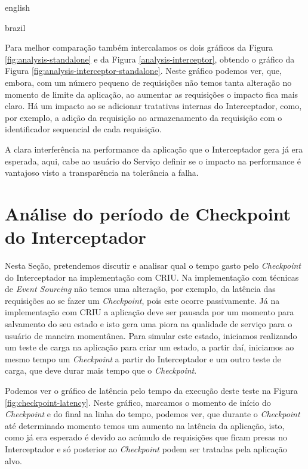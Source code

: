 \begin{otherlanguage*}{english}
\begin{otherlanguage*}{brazil}

Para melhor comparação também intercalamos os dois gráficos da Figura
\ref{fig:analysis-standalone} e da Figura \ref{analysis-interceptor}, obtendo o gráfico
da Figura \ref{fig:analysis-interceptor-standalone}. Neste gráfico podemos ver, que,
embora, com um número pequeno de requisições não temos tanta alteração no momento de
limite da aplicação, ao aumentar as requisições o impacto fica mais claro. Há um impacto
ao se adicionar tratativas internas do Interceptador, como, por exemplo, a adição da
requisição ao armazenamento da requisição com o identificador sequencial de cada requisição.


A clara interferência na performance da aplicação que o Interceptador gera já era esperada,
aqui, cabe ao usuário do Serviço definir se o impacto na performance é vantajoso visto
a transparência na tolerância a falha.

\section{Análise do período de Checkpoint do Interceptador}

Nesta Seção, pretendemos discutir e analisar qual o tempo gasto pelo \textit{Checkpoint} do
Interceptador na implementação com CRIU. Na implementação com técnicas de
\textit{Event Sourcing} não temos uma alteração, por exemplo, da latência das requisições ao
se fazer um \textit{Checkpoint}, pois este ocorre passivamente. Já na implementação com CRIU
a aplicação deve ser pausada por um momento para salvamento do seu estado e isto gera uma
piora na qualidade de serviço para o usuário de maneira momentânea. Para simular este estado,
iniciamos realizando um teste de carga na aplicação para criar um estado, a partir daí, iniciamos
ao mesmo tempo um \textit{Checkpoint} a partir do Interceptador e um outro teste de carga, que deve
durar mais tempo que o \textit{Checkpoint}.

Podemos ver o gráfico de latência pelo tempo da execução deste teste na Figura
\ref{fig:checkpoint-latency}. Neste gráfico, marcamos o momento de início do \textit{Checkpoint}
e do final na linha do tempo, podemos ver, que durante o \textit{Checkpoint} até determinado
momento temos um aumento na latência da aplicação, isto, como já era esperado é devido ao acúmulo
de requisições que ficam presas no Interceptador e só posterior ao \textit{Checkpoint} podem ser
tratadas pela aplicação alvo.


\end{otherlanguage*}
\end{otherlanguage*}
